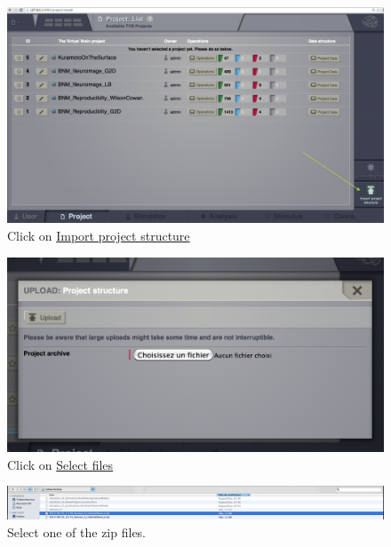 \documentclass{tufte-handout}
\begin{document}
\begin{figure}[h]
  \includegraphics[width=\linewidth]{Handout_UI_ImportingProjects_Import}%
  \caption{Click on \underline{Import project structure}}%
  \label{fig:import}%
\end{figure}

\begin{figure}[h]
  \includegraphics[width=\linewidth]{Handout_UI_ImportingProjects_ImportOverlay}%
  \caption{Click on \underline{Select files}}%
  \label{fig:importoverlay}%
\end{figure}

\begin{figure}[h]
  \includegraphics[width=\linewidth]{Handout_UI_ImportingProjects_SelectFile}%
  \caption{Select one of the zip files.}%
  \label{fig:importselectfile}%
\end{figure}
\end{document}
